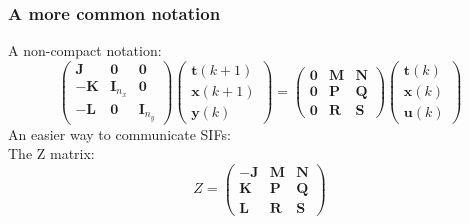 \begin{frame}
	\frametitle{A more common notation}
	A non-compact notation:
	\begin{equation} \label{sifdef}
		\begin{pmatrix}
			\boldsymbol{J} & \boldsymbol{0} & \boldsymbol{0} \\
			\boldsymbol{-K} & \boldsymbol{I}_{n_x} & \boldsymbol{0} \\
			\boldsymbol{-L} & \boldsymbol{0} & \boldsymbol{I}_{n_y} 
		\end{pmatrix}
		\begin{pmatrix}
			\boldsymbol{t} (k+1)  \\
			\boldsymbol{x} (k+1)  \\
			\boldsymbol{y} (k) 
		\end{pmatrix}
		=
		\begin{pmatrix}
			\boldsymbol{0} & \boldsymbol{M} & \boldsymbol{N} \\
			\boldsymbol{0} & \boldsymbol{P} & \boldsymbol{Q} \\
			\boldsymbol{0} & \boldsymbol{R} & \boldsymbol{S} 
		\end{pmatrix}
		\begin{pmatrix}
			\boldsymbol{t} (k)  \\
			\boldsymbol{x} (k)  \\
			\boldsymbol{u} (k) 
		\end{pmatrix}
	\end{equation}
	An easier way to communicate SIFs:\\
		The Z matrix:\\
	\begin{equation}
		Z = 
		\begin{pmatrix}
			\boldsymbol{-J} & \boldsymbol{M} & \boldsymbol{N} \\
			\boldsymbol{K} & \boldsymbol{P} & \boldsymbol{Q} \\
			\boldsymbol{L} & \boldsymbol{R} & \boldsymbol{S} 
		\end{pmatrix}
	\end{equation}
\end{frame}


